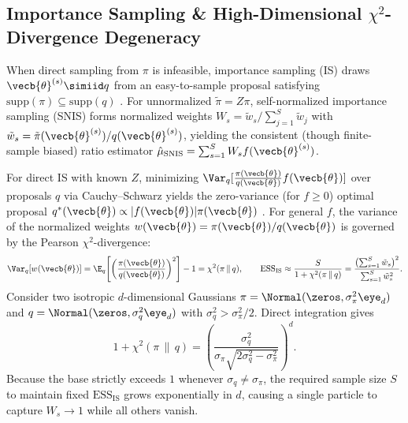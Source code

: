\documentclass[../../../../master.tex]{subfiles}
\begin{document}
\subsection{Importance Sampling \& High-Dimensional \texorpdfstring{$\chi^2$}{Chi-Squared}-Divergence Degeneracy}
\label{subsec:mcmc:importance_sampling}

When direct sampling from $\pi$ is infeasible, importance sampling (IS) draws $\vecb{\theta}^{(s)} \simiid q$ from an easy-to-sample proposal satisfying $\mathrm{supp}(\pi) \subseteq \mathrm{supp}(q)$  . For unnormalized $\tilde{\pi} = Z\pi$, self-normalized importance sampling (SNIS) forms normalized weights $W_s = \tilde{w}_s / \sum_{j=1}^S \tilde{w}_j$ with $\tilde{w}_s = \tilde{\pi}(\vecb{\theta}^{(s)}) / q(\vecb{\theta}^{(s)})$, yielding the consistent (though finite-sample biased) ratio estimator $\hat{\mu}_{\mathrm{SNIS}} = \sum_{s=1}^S W_s f(\vecb{\theta}^{(s)})$.

\begin{coremath}
For direct IS with known $Z$, minimizing $\Var_q[\frac{\pi(\vecb{\theta})}{q(\vecb{\theta})} f(\vecb{\theta})]$ over proposals $q$ via Cauchy--Schwarz yields the zero-variance (for $f \ge 0$) optimal proposal $q^*(\vecb{\theta}) \propto |f(\vecb{\theta})|\pi(\vecb{\theta})$ . For general $f$, the variance of the normalized weights $w(\vecb{\theta}) = \pi(\vecb{\theta})/q(\vecb{\theta})$ is governed by the Pearson $\chi^2$-divergence:
\begin{equation}
  \label{eq:mcmc:chi2_ess}
  \Var_q[w(\vecb{\theta})] = \E_q\!\left[\left(\frac{\pi(\vecb{\theta})}{q(\vecb{\theta})}\right)^2\right] - 1 = \chi^2(\pi \,\|\, q),
  \qquad
  \mathrm{ESS}_{\mathrm{IS}} \approx \frac{S}{1 + \chi^2(\pi \,\|\, q)} = \frac{\bigl(\sum_{s=1}^S \tilde{w}_s\bigr)^2}{\sum_{s=1}^S \tilde{w}_s^2}.
\end{equation}
Consider two isotropic $d$-dimensional Gaussians $\pi = \Normal(\zeros, \sigma_\pi^2 \eye_d)$ and $q = \Normal(\zeros, \sigma_q^2 \eye_d)$ with $\sigma_q^2 > \sigma_\pi^2 / 2$. Direct integration gives
\begin{equation}
  \label{eq:mcmc:is_curse}
  1 + \chi^2(\pi \,\|\, q) = \left(\frac{\sigma_q^2}{\sigma_\pi \sqrt{2\sigma_q^2 - \sigma_\pi^2}}\right)^d.
\end{equation}
Because the base strictly exceeds $1$ whenever $\sigma_q \neq \sigma_\pi$, the required sample size $S$ to maintain fixed $\mathrm{ESS}_{\mathrm{IS}}$ grows exponentially in $d$, causing a single particle to capture $W_s \to 1$ while all others vanish.
\end{coremath}
\end{document}
